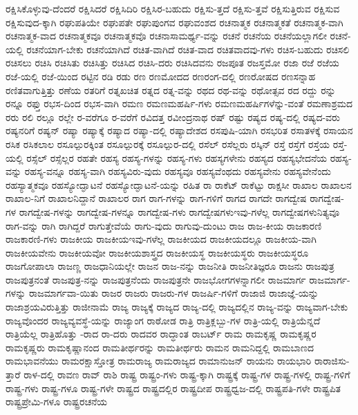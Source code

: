 {ರಕ್ಷಿಸಿಕೊಳ್ಳುವು-ದೆಂದರೆ
ರಕ್ಷಿಸಿದರೆ
ರಕ್ಷಿಸಿದಿರಿ
ರಕ್ಷಿಸಿರ-ಬಹುದು
ರಕ್ಷಿಸು-ತ್ತದೆ
ರಕ್ಷಿಸು-ತ್ತವೆ
ರಕ್ಷಿಸುತ್ತಿರುವ
ರಕ್ಷಿಸುವ
ರಕ್ಷಿಸುವುದ-ಕ್ಕಾಗಿ
ರಘುಪತಿಯೇ
ರಘುಪತೇ
ರಘುಪುಂಗವ
ರಘುವಂಶದ
ರಚನಾತ್ಮಕ
ರಚನಾತ್ಮಕತೆ
ರಚನಾತ್ಮಕ-ವಾಗಿ
ರಚನಾತ್ಮಕ-ವಾದ
ರಚನಾತ್ಮಕವೂ
ರಚನಾತ್ಮಕವೊ
ರಚನಾಸಾಮರ್ಥ್ಯ-ವನ್ನು
ರಚನೆ
ರಚನೆಯ
ರಚನೆಯಲ್ಲಾಗಲೀ
ರಚನೆ-ಯಲ್ಲಿ
ರಚನೆಯಾಗ-ಬೇಕು
ರಚನೆಯಾಗಿದೆ
ರಚಿತ-ವಾಗಿದೆ
ರಚಿತ-ವಾದ
ರಚಿತವಾದವು-ಗಳು
ರಚಿಸ-ಬಹುದು
ರಚಿಸಲಿ
ರಚಿಸಲು
ರಚಿಸಿ
ರಚಿಸಿತು
ರಚಿಸಿತ್ತು
ರಚಿಸಿದ
ರಚಿಸಿ-ದರು
ರಚಿಸಿದವನು
ರಜಪೂತ
ರಜಸ್ತಮೋ
ರಜಾ
ರಜೆ
ರಜೆಯ
ರಜೆ-ಯಲ್ಲಿ
ರಜೆ-ಯಿಂದ
ರಟ್ಟಿನ
ರಡಿ
ರಡು
ರಣ
ರಣಮೋದದ
ರಣರಂಗ-ದಲ್ಲಿ
ರಣರೋಷದ
ರಣಸನ್ನಾಹ
ರಣಿತವಾಗುತ್ತಿತ್ತು
ರಣೆಯ
ರತರಿಗೆ
ರತ್ನಖಚಿತ
ರತ್ನದ
ರತ್ನ-ವನ್ನು
ರಥದ
ರಥ-ವನ್ನು
ರಥೋತ್ಸವ
ರದ
ರದ್ದು
ರನ್ನು
ರನ್ನೂ
ರಫ್ತು
ರಭಸ-ದಿಂದ
ರಭಸ-ವಾಗಿ
ರಮಣ
ರಮಣಮಹರ್ಷಿ-ಗಳು
ರಮಣಮಹರ್ಷಿಗಳೆನ್ನು-ವಂತೆ
ರಮಣಾಶ್ರಮದ
ರರು
ರಲಿ
ರಲ್ಲೂ
ರಲ್ಲೇ
ರ-ವರೆಗೂ
ರ-ವರೆಗೆ
ರವಿದತ್ತ
ರವೀಂದ್ರನಾಥ
ರಷ್
ರಷ್ಟು
ರಷ್ಯದ
ರಷ್ಯ-ದಲ್ಲಿ
ರಷ್ಯದ-ವರು
ರಷ್ಯನರಿಗೆ
ರಷ್ಯನ್
ರಷ್ಯಾ
ರಷ್ಯಾಕ್ಕೆ
ರಷ್ಯಾದ
ರಷ್ಯಾ-ದಲ್ಲಿ
ರಷ್ಯಾದೇಶದ
ರಸಪುಷಿ-ಯಾಗಿ
ರಸಭರಿತ
ರಸಾತಳಕ್ಕೆ
ರಸಾಯನ
ರಸಿಕ
ರಸಿಕಲಾಲ
ರಸೂಲ್ಪುರಕ್ಕಿಂತ
ರಸೂಲ್ಪುರಕ್ಕೆ
ರಸೂಲ್ಪುರ-ದಲ್ಲಿ
ರಸೆಲ್
ರಸೆಲ್ಲರು
ರಸ್ಕಿನ್
ರಸ್ತೆ
ರಸ್ತೆಗೆ
ರಸ್ತೆಯ
ರಸ್ತೆ-ಯಲ್ಲಿ
ರಸ್ಸೆಲ್
ರಸ್ಸೆಲ್ಲರ
ರಹತೇ
ರಹಸ್ಯ
ರಹಸ್ಯ-ಗಳನ್ನು
ರಹಸ್ಯ-ಗಳು
ರಹಸ್ಯಗಳೇನು
ರಹಸ್ಯದ
ರಹಸ್ಯಭೇದನೆಯ
ರಹಸ್ಯ-ವನ್ನು
ರಹಸ್ಯ-ವನ್ನೂ
ರಹಸ್ಯ-ವಾಗಿ
ರಹಸ್ಯವಿರು-ವುದು
ರಹಸ್ಯವೂ
ರಹಸ್ಯವೆಂಥದು
ರಹಸ್ಯವೇನು
ರಹಸ್ಯವೇನೆಂದು
ರಹಸ್ಯಾತ್ಮಕವೂ
ರಹಸ್ಯೋದ್ಘಾಟನೆ
ರಹಸ್ಯೋದ್ಘಾಟನೆ-ಯನ್ನು
ರಹಿತ
ರಾ
ರಾಕೆಟ್
ರಾಕೆಟ್ಟು
ರಾಕ್ಷಸೀ
ರಾಖಾಲ
ರಾಖಾಲನ
ರಾಖಾಲ-ನಿಗೆ
ರಾಖಾಲನಿದ್ದಾನೆ
ರಾಖಾಲರ
ರಾಗ
ರಾಗ-ಗಳನ್ನು
ರಾಗ-ಗಳಿಗೆ
ರಾಗದ
ರಾಗದೇ
ರಾಗದ್ವೇಷ
ರಾಗದ್ವೇಷ-ಗಳ
ರಾಗದ್ವೇಷ-ಗಳನ್ನು
ರಾಗದ್ವೇಷ-ಗಳನ್ನೂ
ರಾಗದ್ವೇಷ-ಗಳು
ರಾಗದ್ವೇಷಗಳುಇವು-ಗಳೆಲ್ಲ
ರಾಗದ್ವೇಷಗಳುನಿತ್ಯವೂ
ರಾಗ-ವನ್ನು
ರಾಗಿ
ರಾಗಿದ್ದರೆ
ರಾಗುತ್ತೇವೆಯೆ
ರಾಗು-ವುದು
ರಾಗುವು-ದುಂಟು
ರಾಜ
ರಾಜ-ಕೀಯ
ರಾಜಕಾರಣಿ
ರಾಜಕಾರಣಿ-ಗಳು
ರಾಜಕೀಯ
ರಾಜಕೀಯಇವು-ಗಳೆಲ್ಲ
ರಾಜಕೀಯದ
ರಾಜಕೀಯದಲ್ಲೂ
ರಾಜಕೀಯ-ವಾಗಿ
ರಾಜಕೀಯವೇನು
ರಾಜಕೀಯವೋ
ರಾಜಕೀಯಶಾಸ್ತ್ರದ
ರಾಜಕೀಯಸ್ಥ
ರಾಜಕೀಯಸ್ಥರು
ರಾಜಕೀಯಸ್ಥರೂ
ರಾಜಗೋಪಾಲಾ
ರಾಜಣ್ಣ
ರಾಜಧಾನಿಯಲ್ಲೇ
ರಾಜನ
ರಾಜ-ನನ್ನು
ರಾಜನೀತಿ
ರಾಜನೀತಿಜ್ಞರೂ
ರಾಜನು
ರಾಜಪುತ್ರ
ರಾಜಪುತ್ರನಂತೆ
ರಾಜಪುತ್ರ-ನನ್ನು
ರಾಜಪುತ್ರನೆಂದು
ರಾಜಪುತ್ರನೇ
ರಾಜಭೋಗಗಳನ್ನಾಗಲೀ
ರಾಜಮಾರ್ಗ
ರಾಜಮಾರ್ಗ-ಗಳನ್ನು
ರಾಜಮಾರ್ಗವಾ-ಯಿತು
ರಾಜರ
ರಾಜರು
ರಾಜರು-ಗಳ
ರಾಜರ್ಷಿ-ಗಳಿಗೆ
ರಾಜಾಜಿ
ರಾಜಾಜ್ಞೆ-ಯನ್ನು
ರಾಜಾಶ್ರಯವಿರುತ್ತಿತ್ತು
ರಾಜೀನಾಮೆ
ರಾಜ್ಯ
ರಾಜ್ಯಕ್ಕೆ
ರಾಜ್ಯದ
ರಾಜ್ಯ-ದಲ್ಲಿ
ರಾಜ್ಯದಲ್ಲಿನ
ರಾಜ್ಯ-ವನ್ನು
ರಾಜ್ಯವಾಗ-ಬೇಕು
ರಾಜ್ಯವೊಂದರ
ರಾಜ್ಯವ್ಯವಸ್ಥೆ-ಯನ್ನು
ರಾಜ್ಯಾಂಗ
ರಾಠೋಡ
ರಾತ್ರಿ
ರಾತ್ರಿಕ್ಲಬ್ಬು-ಗಳ
ರಾತ್ರಿ-ಯಲ್ಲಿ
ರಾತ್ರಿಯೆನ್ನದೆ
ರಾತ್ರಿಯೆಲ್ಲ
ರಾತ್ರಿಹೊತ್ತು
-ರಾದ
ರಾ-ದರು
ರಾದವರ
ರಾದ್ಧಾಂತ
ರಾಬರ್ಟ್
ರಾಮ
ರಾಮಕೃಷ್ಣ
ರಾಮಕೃಷ್ಣರ
ರಾಮಕೃಷ್ಣರು
ರಾಮಕೃಷ್ಣಾನಂದ
ರಾಮತೀರ್ಥರನ್ನು
ರಾಮತೀರ್ಥರು
ರಾಮನ
ರಾಮನಿದ್ದಲ್ಲಿ
ರಾಮಬಾಣದ
ರಾಮಭಾವನೆಯು
ರಾಮರಕ್ಷಾಸ್ತೋತ್ರ
ರಾಮರಾಜ್ಯ
ರಾಮರಾಜ್ಯದ
ರಾಮಾನುಜನ್
ರಾಯನು
ರಾಯಭಾರಿ
ರಾರಾಜಿಸು-ತ್ತಾರೆ
ರಾಳ-ದಲ್ಲಿ
ರಾವಣ
ರಾವ್
ರಾಶಿ
ರಾಷ್ಟ್ರ
ರಾಷ್ಟ್ರಂ-ಗಳು
ರಾಷ್ಟ್ರ-ಕ್ಕಾಗಿ
ರಾಷ್ಟ್ರಕ್ಕೆ
ರಾಷ್ಟ್ರ-ಗಳ
ರಾಷ್ಟ್ರ-ಗಳಲ್ಲಿ
ರಾಷ್ಟ್ರ-ಗಳಿಗೆ
ರಾಷ್ಟ್ರ-ಗಳು
ರಾಷ್ಟ್ರ-ಗಳೂ
ರಾಷ್ಟ್ರ-ಗಳೇ
ರಾಷ್ಟ್ರದ
ರಾಷ್ಟ್ರದಲ್ಲಿರ
ರಾಷ್ಟ್ರದೀಪ
ರಾಷ್ಟ್ರಧ್ವಜ-ದಲ್ಲಿ
ರಾಷ್ಟ್ರಪತಿ-ಗಳೇ
ರಾಷ್ಟ್ರಪಿತ
ರಾಷ್ಟ್ರಪ್ರೇಮಿ-ಗಳೂ
ರಾಷ್ಟ್ರರಚನೆಯ
}
